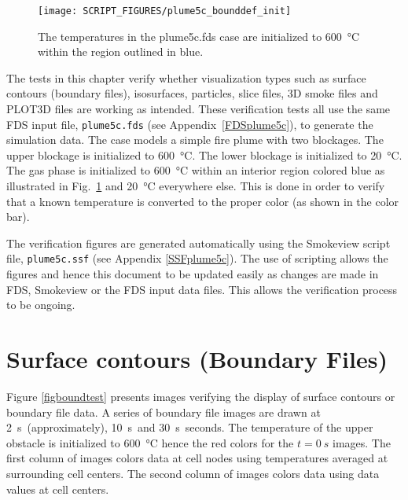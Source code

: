 \documentclass[11pt,twoside]{book}
\begin{document}
\begin{figure}[bph]
\begin{center}
\texttt{[image: SCRIPT\_FIGURES/plume5c\_bounddef\_init]}
\end{center}
\caption{The temperatures in the plume5c.fds case are initialized to
\SI{600}{\degreeCelsius} within the region outlined in blue.}
\label{figbounddef}%
\end{figure}

The tests in this chapter verify whether visualization types such
as surface contours (boundary files), isosurfaces, particles,
slice files, 3D smoke files and PLOT3D files are working as
intended.  These verification tests all use the same FDS input
file, {\tt plume5c.fds} (see Appendix~\ref{FDSplume5c}), to
generate the simulation data.  The case models a simple fire plume
with two blockages.  The upper blockage is initialized to
\SI{600}{\degreeCelsius}.   The lower blockage is initialized to
\SI{20}{\degreeCelsius}.  The gas phase is initialized to
\SI{600}{\degreeCelsius} within an interior region colored blue as
illustrated in Fig.~\ref{figbounddef} and \SI{20}{\degreeCelsius}
everywhere else.  This is done in order to verify that a known
temperature is converted to the proper color (as shown in the
color bar).

The verification figures are generated automatically using the Smokeview
script file, {\tt plume5c.ssf} (see Appendix \ref{SSFplume5c}).  The use
of scripting allows the figures and hence this document to be updated
easily as changes are made in FDS, Smokeview or the FDS input data files.
This allows the verification process to be ongoing.

\clearpage

\section{Surface contours (Boundary Files)}
Figure \ref{figboundtest} presents images verifying the display of surface
contours or boundary file data. A series of boundary file images are drawn
at \SI{2}{s}\ (approximately), \SI{10}{s}\ and \SI{30}{s}\ seconds.
The temperature of the upper obstacle is initialized to \SI{600}{\degreeCelsius}
hence the red colors for the $t=\SI{0}{s}$ images. The first column of images
colors data at cell nodes using temperatures averaged at surrounding cell centers.
The second column of images colors data using data values at cell centers.
\end{document}
